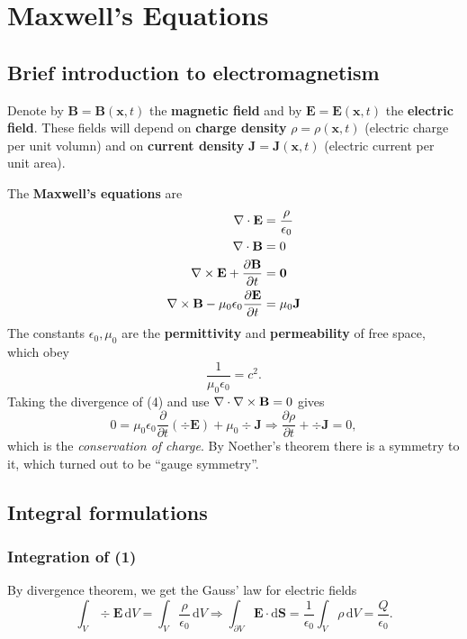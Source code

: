 \section{Maxwell's Equations}
\subsection{Brief introduction to electromagnetism}
\begin{definition}
    Denote by $ \mathbf{B} = \mathbf{B}(\mathbf{x},t) $ the \textbf{magnetic field} and by $ \mathbf{E}=\mathbf{E}(\mathbf{x},t) $ the \textbf{electric field}. These fields will depend on \textbf{charge density} $ \rho = \rho(\mathbf{x},t) $ (electric charge per unit volumn) and on \textbf{current density} $ \mathbf{J} = \mathbf{J}(\mathbf{x},t) $ (electric current per unit area).
\end{definition}
The \textbf{Maxwell's equations} are 
\begin{align}
    \nabla\cdot \mathbf{E} &= \frac{\rho}{\epsilon_0}\\ 
    \nabla\cdot\mathbf{B}&= 0\\ 
    \nabla\times\mathbf{E}+\frac{\partial \mathbf{B}}{\partial t}&=\mathbf{0} \\ 
    \nabla\times\mathbf{B}-\mu_0 \epsilon_0 \frac{\partial \mathbf{E}}{\partial t}&=\mu_0 \mathbf{J} 
\end{align}
The constants $ \epsilon_0,\mu_0 $ are the \textbf{permittivity} and \textbf{permeability} of free space, which obey 
\[
    \frac{1}{\mu_0 \epsilon_0}=c^2.
\]
Taking the divergence of (4) and use $ \nabla\cdot\nabla\times\mathbf{B}=0 $ gives
\[
    0 = \mu_0 \epsilon_0 \frac{\partial }{\partial t}(\div\mathbf{E})+\mu_0 \div\mathbf{J} \Longrightarrow \frac{\partial \rho}{\partial t}+\div\mathbf{J}=0,  
\]
which is the \textit{conservation of charge}. By Noether's theorem there is a symmetry to it, which turned out to be ``gauge symmetry''.

\subsection{Integral formulations}
\subsubsection*{Integration of (1)}
By divergence theorem, we get the Gauss’ law for electric fields
\[
    \int_{V} \div\mathbf{E} \,\mathrm{d}V  =  \int_{V} \frac{\rho}{\epsilon_0} \,\mathrm{d}V 
    \Longrightarrow  \int_{\partial V} \mathbf{E} \cdot\mathrm{d}\mathbf{S} =\frac{1}{\epsilon_0} \int_{V} \rho \,\mathrm{d}V = \frac{Q}{\epsilon_0} .
\]
